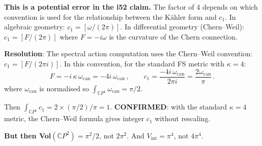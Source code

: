 \documentclass[11pt,a4paper]{article}
\newcommand{\CP}{\mathbb{C}P}
\begin{document}
\textbf{This is a potential error in the i52 claim.} The factor of 4 depends on which convention is used for the relationship between the K\"ahler form and $c_1$. In algebraic geometry: $c_1 = [\omega/(2\pi)]$. In differential geometry (Chern--Weil): $c_1 = [F/(2\pi)]$ where $F = -i\omega$ is the curvature of the Chern connection.

\textbf{Resolution}: The spectral action computation uses the Chern--Weil convention: $c_1 = [F/(2\pi i)]$. In this convention, for the standard FS metric with $\kappa = 4$:
\begin{equation}
F = -i\,\kappa\,\omega_{\mathrm{can}} = -4i\,\omega_{\mathrm{can}}\,,\qquad c_1 = \frac{-4i\,\omega_{\mathrm{can}}}{2\pi i} = \frac{2\omega_{\mathrm{can}}}{\pi}\,.
\end{equation}
where $\omega_{\mathrm{can}}$ is normalised so $\int_{\CP^1} \omega_{\mathrm{can}} = \pi/2$.

Then $\int_{\CP^1} c_1 = 2 \times (\pi/2)/\pi = 1$. \textbf{CONFIRMED}: with the standard $\kappa = 4$ metric, the Chern--Weil formula gives integer $c_1$ without rescaling.

\textbf{But then Vol$(\CP^2) = \pi^2/2$}, not $2\pi^2$. And $V_{\mathrm{int}} = \pi^4$, not $4\pi^4$.
\end{document}
